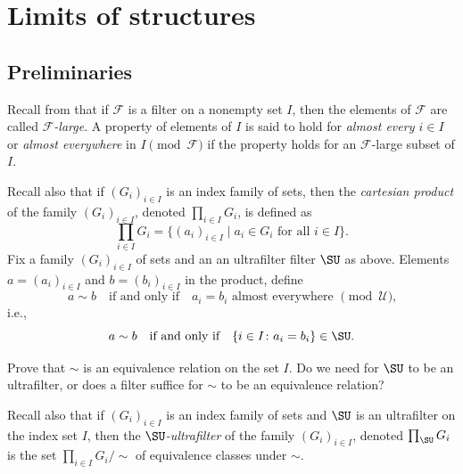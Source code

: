 \chapter{Limits of structures}


\section{Preliminaries}

Recall from \label{N:Large sets} that if $\mathscr{F}$ is a filter on a nonempty set $I$, then the elements of $\mathscr{F}$ are called \emph{$\mathscr{F}$-large}. A property of elements of $I$ is said to hold for \emph{almost every $i\in I$} or \emph{almost everywhere} in $I \pmod{\mathscr{F}}$ if the property holds for an $\mathscr{F}$-large subset of $I$.

Recall also that if $(G_i)_{i\in I}$ is an index family of sets, then the \emph{cartesian product} of the family $(G_i)_{i\in I}$, denoted $\prod_{i\in I}G_i$, is defined as
\[
\prod_{i\in I} G_i = \{ (a_i)_{i\in I} \mid \text{$a_i\in G_i$ for all $i \in I$}\}.
\]
Fix a family $(G_i)_{i\in I}$ of sets and an an ultrafilter filter $\SU$ as above.
Elements $a= (a_i)_{i\in I}$ and $b= (b_i)_{i\in I}$ in the product, define
\[
a\sim b 
\quad\text{if and only if}\quad
\text{$a_i=b_i$ almost everywhere $\pmod{\mathscr{U}}$,}
\]
 i.e., 
 \[
 a\sim b 
\quad\text{if and only if}\quad
\{i\in I \colon a_i=b_i \}\in\SU.
\]



\begin{exercise}
Prove that $\sim$ is an equivalence relation on the set $I$. Do we need for $\SU$ to be an ultrafilter, or does a filter suffice for $\sim$ to be an equivalence relation?
\end{exercise}

\begin{definition}
Recall also that if $(G_i)_{i\in I}$ is an index family of sets and $\SU$ is an ultrafilter on the index set $I$, then the \emph{$\SU$-ultrafilter} of the family $(G_i)_{i\in I}$, denoted $\prod_{\SU}G_i$ is the set $\prod_{i\in I}G_i/\sim$ of equivalence classes  under $\sim$.
\end{definition}


